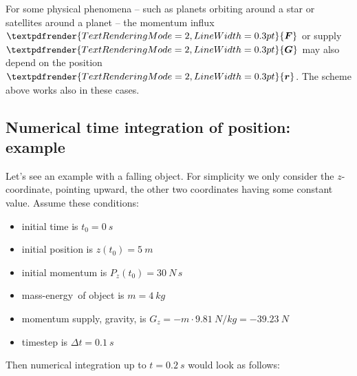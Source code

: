 \documentclass[a4paper,12pt,%
onecolumn,oneside,titlepage,%
british%
]{memoir}
\renewcommand*{\bm}[1]{\textpdfrender{TextRenderingMode=2,LineWidth=0.3pt}{\boldsymbol{#1}}}
\newcommand*{\incr}{\Delta}%
\renewcommand*{\|}[1][]{\nonscript\:#1\vert\nonscript\:\mathopen{}}
\newcommand*{\masse}{mass-energy}
\newcommand*{\yr}{\bm{r}}
\newcommand*{\yti}{t_{0}}
\newcommand*{\Dt}{\incr t}
\newcommand*{\yM}{m}%
\newcommand*{\yF}{\bm{F}}
\newcommand*{\yG}{\bm{G}}
\begin{document}
For some physical phenomena -- such as planets orbiting around a star or satellites around a planet -- the momentum influx $\yF$ or supply $\yG$ may also depend on the position $\yr$. The scheme above works also in these cases.

\subsection{Numerical time integration of position: example}
\label{sec:example_falling_object_timestep}

Let's see an example with a falling object. For simplicity we only consider the $z$-coordinate, pointing upward, the other two coordinates having some constant value. Assume these conditions:
\begin{itemize}[nosep]
\item initial time is $\yti=\qty{0}{s}$
\item initial position is $z(\yti)=\qty{5}{m}$
\item initial momentum is $P_{z}(\yti)=\qty{30}{N\,s}$
\item \masse\ of object is $\yM=\qty{4}{kg}$
\item momentum supply, gravity, is $G_{z}=-\yM\cdot\qty{9.81}{N/kg} = \qty{-39.23}{N}$
\item timestep is $\Dt = \qty{0.1}{s}$
\end{itemize}
Then numerical integration up to $t=\qty{0.2}{s}$ would look as follows:\noprelistbreak
\end{document}
